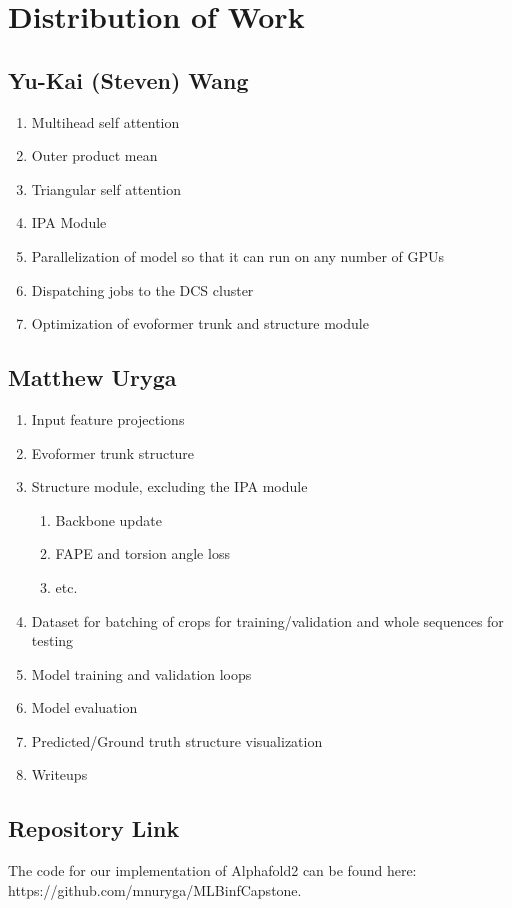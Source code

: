 \documentclass[11pt]{article}
\newcommand{\np}{\newpage}
\begin{document}
\section{Distribution of Work}
\subsection{Yu-Kai (Steven) Wang}
\begin{enumerate}[label=(\alph*)]
	\item Multihead self attention
	\item Outer product mean
	\item Triangular self attention
	\item IPA Module
	\item Parallelization of model so that it can run on any number of GPUs
	\item Dispatching jobs to the DCS cluster
	\item Optimization of evoformer trunk and structure module
\end{enumerate}

\subsection{Matthew Uryga}
\begin{enumerate}[label=(\alph*)]
	\item Input feature projections
	\item Evoformer trunk structure
	\item Structure module, excluding the IPA module
	\begin{enumerate}[label=(\roman*)]
		\item Backbone update
		\item FAPE and torsion angle loss
		\item etc.
	\end{enumerate}
	\item Dataset for batching of crops for training/validation and whole sequences for testing
	\item Model training and validation loops
	\item Model evaluation
	\item Predicted/Ground truth structure visualization
	\item Writeups
\end{enumerate}

\subsection{Repository Link}
The code for our implementation of Alphafold2 can be found here:\\https://github.com/mnuryga/MLBinfCapstone.
\np
\end{document}
